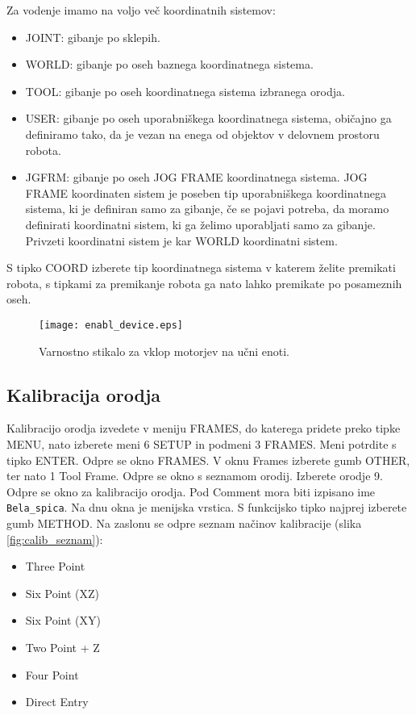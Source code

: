 Za vodenje imamo na voljo več koordinatnih sistemov:

\begin{itemize}
	\item JOINT: gibanje po sklepih.
	\item WORLD: gibanje po oseh baznega koordinatnega sistema.
	\item TOOL: gibanje po oseh koordinatnega sistema izbranega orodja.
	\item USER: gibanje po oseh uporabniškega koordinatnega sistema, običajno ga definiramo tako, da je vezan na enega od objektov v delovnem prostoru robota.
	\item JGFRM: gibanje po oseh JOG FRAME koordinatnega sistema. JOG FRAME koordinaten sistem je poseben tip uporabniškega koordinatnega sistema, ki je definiran samo za gibanje, če se pojavi potreba, da moramo definirati koordinatni sistem, ki ga želimo uporabljati samo za gibanje. Privzeti koordinatni sistem je kar WORLD koordinatni sistem.
\end{itemize} 

S tipko COORD izberete tip koordinatnega sistema v katerem želite premikati robota, s tipkami za premikanje robota ga nato lahko premikate po posameznih oseh. 
\begin{figure}[!hbt]
	\centering
	\texttt{[image: enabl\_device.eps]}
	\caption{Varnostno stikalo za vklop motorjev na učni enoti.}
	\label{fig:enabl_device}
\end{figure}

\subsection{Kalibracija orodja}

Kalibracijo orodja izvedete v meniju FRAMES, do katerega pridete preko tipke MENU, nato izberete meni 6 SETUP in podmeni 3 FRAMES. Meni potrdite s tipko ENTER. Odpre se okno FRAMES. V oknu Frames izberete gumb OTHER, ter nato 1 Tool Frame. Odpre se okno s seznamom orodij. Izberete orodje 9. Odpre se okno za kalibracijo orodja. Pod Comment mora biti izpisano ime \verb|Bela_spica|. Na dnu okna je menijska vrstica. S funkcijsko tipko najprej izberete gumb METHOD. Na zaslonu se odpre seznam načinov kalibracije (slika \ref{fig:calib_seznam}):

\begin{itemize}
	\item Three Point
	\item Six Point (XZ)
	\item Six Point (XY)
	\item Two Point + Z
	\item Four Point
	\item Direct Entry
\end{itemize}

